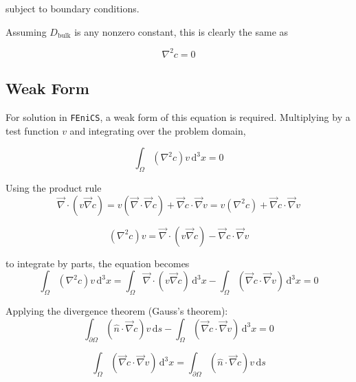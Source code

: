 subject to boundary conditions.

Assuming $D_{\mathrm{bulk}}$ is any nonzero constant, this is clearly the same as

\begin{equation}
\nabla^2 c = 0
\end{equation}


\subsection{Weak Form}\label{subsec:unhom_fick_weak}

For solution in \texttt{FEniCS}, a weak form of this equation is required.
Multiplying by a test function $v$ and integrating over the problem domain,

\begin{equation}
\int_{\Omega} \left(\nabla^2 c \right) v \,\mathrm{d}^3x = 0
\end{equation}

Using the product rule
\begin{equation}
\vec{\nabla} \cdot \left( v \vec{\nabla} c \right) =
v \left(\vec{\nabla} \cdot \vec{\nabla} c \right) + \vec{\nabla}c \cdot \vec{\nabla}v =
v \left(\nabla^2 c \right) + \vec{\nabla}c \cdot \vec{\nabla}v
\end{equation}

\begin{equation}
\left(\nabla^2 c \right) v =
\vec{\nabla} \cdot \left( v \vec{\nabla} c \right) - \vec{\nabla}c \cdot \vec{\nabla}v
\end{equation}

to integrate by parts, the equation becomes
\begin{equation}
\int_{\Omega} \left(\nabla^2 c \right) v \,\mathrm{d}^3x =
\int_{\Omega} \vec{\nabla} \cdot \left( v \vec{\nabla} c \right) \,\mathrm{d}^3x
- \int_{\Omega} \left( \vec{\nabla}c \cdot \vec{\nabla}v \right) \,\mathrm{d}^3x =0
\end{equation}

Applying the divergence theorem (Gauss's theorem):
\begin{equation}
\int_{\partial\Omega} \left( \hat{n} \cdot \vec{\nabla} c \right) v\,\mathrm{d}s
- \int_{\Omega} \left( \vec{\nabla}c \cdot \vec{\nabla}v \right) \,\mathrm{d}^3x = 0
\end{equation}

\begin{equation}
\int_{\Omega} \left( \vec{\nabla}c \cdot \vec{\nabla}v \right) \,\mathrm{d}^3x =
\int_{\partial\Omega} \left( \hat{n} \cdot \vec{\nabla} c \right) v\,\mathrm{d}s
\end{equation}

